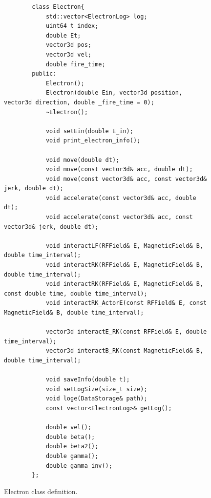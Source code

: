 \documentclass[a4paper,oneside,12pt]{report}
\numberwithin{equation}{chapter}
\begin{document}
\begin{figure}[H]
    \centering
    \begin{verbatim}
        class Electron{
            std::vector<ElectronLog> log;
            uint64_t index;
            double Et;
            vector3d pos;
            vector3d vel;
            double fire_time;
        public:
            Electron();
            Electron(double Ein, vector3d position, vector3d direction, double _fire_time = 0);
            ~Electron();

            void setEin(double E_in);
            void print_electron_info();

            void move(double dt);
            void move(const vector3d& acc, double dt);
            void move(const vector3d& acc, const vector3d& jerk, double dt);
            void accelerate(const vector3d& acc, double dt);
            void accelerate(const vector3d& acc, const vector3d& jerk, double dt);
            
            void interactLF(RFField& E, MagneticField& B, double time_interval);
            void interactRK(RFField& E, MagneticField& B, double time_interval);
            void interactRK(RFField& E, MagneticField& B, const double time, double time_interval);
            void interactRK_ActorE(const RFField& E, const MagneticField& B, double time_interval);

            vector3d interactE_RK(const RFField& E, double time_interval);
            vector3d interactB_RK(const MagneticField& B, double time_interval);

            void saveInfo(double t);
            void setLogSize(size_t size);
            void loge(DataStorage& path);
            const vector<ElectronLog>& getLog();

            double vel();
            double beta();
            double beta2();
            double gamma();
            double gamma_inv();
        };
    \end{verbatim}
    \vspace{20pt}
    \caption{Electron class definition.}
    \label{fig:e_class}
\end{figure}
\end{document}
